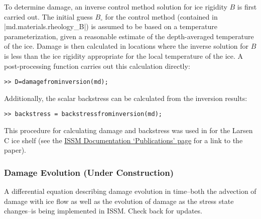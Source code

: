 To determine damage, an inverse control method solution for ice rigidity $B$ is first carried out. The initial guess $B_{\circ}$ for the control method (contained in \lstinlinebg|md.materials.rheology_B|) is assumed to be based on a temperature parameterization, given a reasonable estimate of the depth-averaged temperature of the ice. Damage is then calculated in locations where the inverse solution for $B$ is less than the ice rigidity appropriate for the local temperature of the ice. A post-processing function carries out this calculation directly:
\begin{lstlisting}
>> D=damagefrominversion(md);
\end{lstlisting}

Additionally, the scalar backstress can be calculated from the inversion results:
\begin{lstlisting}
>> backstress = backstressfrominversion(md);
\end{lstlisting}

This procedure for calculating damage and backstress was used in \cite{Borstad2013} for the Larsen C ice shelf (see the 
\href{\publicationsUrl}{ISSM Documentation `Publications' page}
for a link to the paper).

\subsubsection{Damage Evolution (Under Construction)}
A differential equation describing damage evolution in time--both the advection of damage with ice flow as well as the evolution of damage as the stress state changes--is being implemented in ISSM. Check back for updates.

\clearpage %
